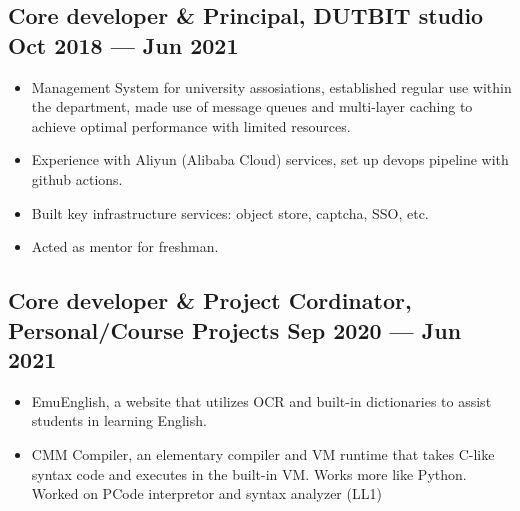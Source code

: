 \documentclass[a4,10pt]{article}
\newenvironment{zitemize}{
\begin{itemize}\itemsep0pt \parskip0pt \parsep1pt}
{\end{itemize}\vspace{-0.5cm}}
\begin{document}


\subsection*{Core developer \& Principal, {\normalsize\normalfont DUTBIT studio} \hfill  Oct 2018 --- Jun 2021} 
    \begin{zitemize}
        \item Management System for university assosiations, established regular use within the department, made use of message queues and multi-layer caching to achieve optimal performance with limited resources.
        \item Experience with Aliyun (Alibaba Cloud) services, set up devops pipeline with github actions. 
        \item Built key infrastructure services: object store, captcha, SSO, etc.
        \item Acted as mentor for freshman.
    \end{zitemize}


\subsection*{Core developer \& Project Cordinator, {\normalsize\normalfont Personal/Course Projects} \hfill Sep 2020 --- Jun 2021} 
    \begin{zitemize}
        \item EmuEnglish, a website that utilizes OCR and built-in dictionaries to assist students in learning English.
        \item CMM Compiler, an elementary compiler and VM runtime that takes C-like syntax code and executes in the built-in VM. Works more like Python. Worked on PCode interpretor and syntax analyzer (LL1)
    \end{zitemize}
\end{document}
